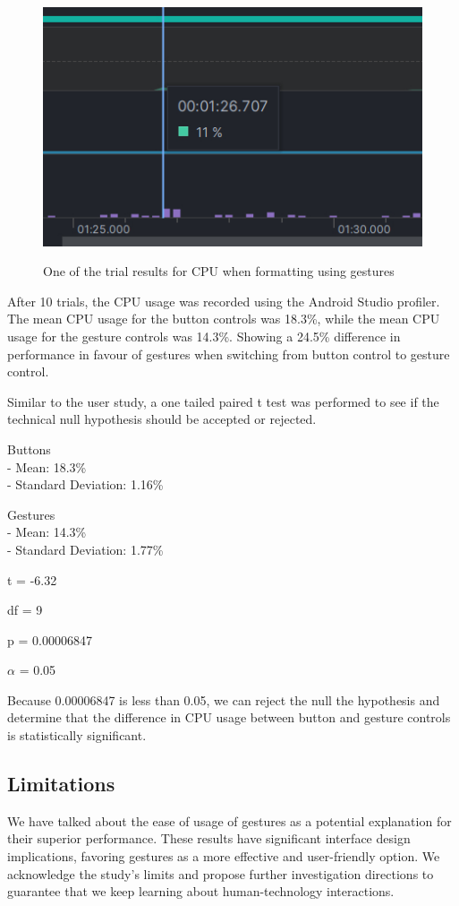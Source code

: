\documentclass[conference]{IEEEtran}
\begin{document}
\begin{figure}[ht]
    \centering
    \includegraphics[scale=0.4]{profilerresults/cpuusage_gst.jpg}\\
    \caption{One of the trial results for CPU when formatting using gestures}
    \label{fig:enter-label}
\end{figure}

After 10 trials, the CPU usage was recorded using the Android Studio profiler. The mean CPU usage for the button controls was 18.3\%, while the mean CPU usage for the gesture controls was 14.3\%. Showing a 24.5\% difference in performance in favour of gestures when switching from button control to gesture control.

Similar to the user study, a one tailed paired t test was performed to see if the technical null hypothesis should be accepted or rejected.

Buttons\\
- Mean: 18.3\%\\
- Standard Deviation: 1.16\%

Gestures\\
- Mean: 14.3\%\\
- Standard Deviation: 1.77\%

t = -6.32

df = 9

p = 0.00006847

$\alpha$ = 0.05

Because 0.00006847 is less than 0.05, we can reject the null the hypothesis and determine that the difference in CPU usage between button and gesture controls is statistically significant.


\subsection*{Limitations}
We have talked about the ease of usage of gestures as a potential explanation for their superior performance. These results have significant interface design implications, favoring gestures as a more effective and user-friendly option. We acknowledge the study's limits and propose further investigation directions to guarantee that we keep learning about human-technology interactions.\\
\end{document}
